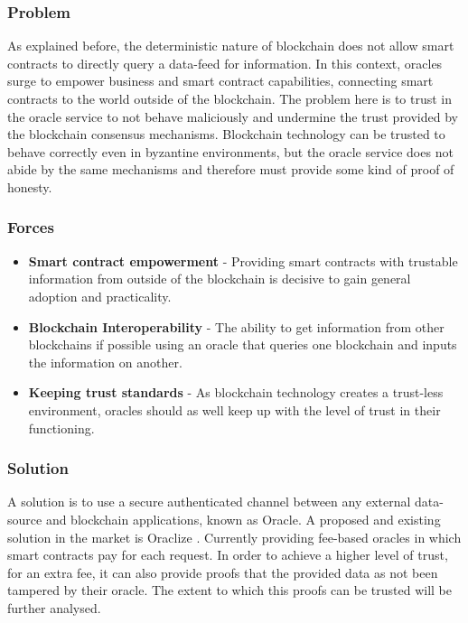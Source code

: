 \subsubsection{Problem}
As explained before, the deterministic nature of blockchain does not allow smart contracts to directly query a data-feed for information. In this context, oracles surge to empower business and smart contract capabilities, connecting smart contracts to the world outside of the blockchain. The problem here is to trust in the oracle service to not behave maliciously and undermine the trust provided by the blockchain consensus mechanisms. Blockchain technology can be trusted to behave correctly even in byzantine environments, but the oracle service does not abide by the same mechanisms and therefore must provide some kind of proof of honesty. 

\subsubsection{Forces}
\begin{itemize}
\item \textbf{Smart contract empowerment} - Providing smart contracts with trustable information from outside of the blockchain is decisive to gain general adoption and practicality.
\item \textbf{Blockchain Interoperability} - The ability to get information from other blockchains if possible using an oracle that queries one blockchain and inputs the information on another.
\item \textbf{Keeping trust standards} - As blockchain technology creates a trust-less environment, oracles should as well keep up with the level of trust in their functioning.
\end{itemize}


\subsubsection{Solution}
A solution is to use a secure authenticated channel between any external data-source and blockchain applications, known as Oracle. A proposed and existing solution in the market is Oraclize  \cite{Oraclize.it2018OraclizeDocumentation}. Currently providing fee-based oracles in which smart contracts pay for each request. In order to achieve a higher level of trust, for an extra fee, it can also provide proofs that the provided data as not been tampered by their oracle. The extent to which this proofs can be trusted will be further analysed. 

